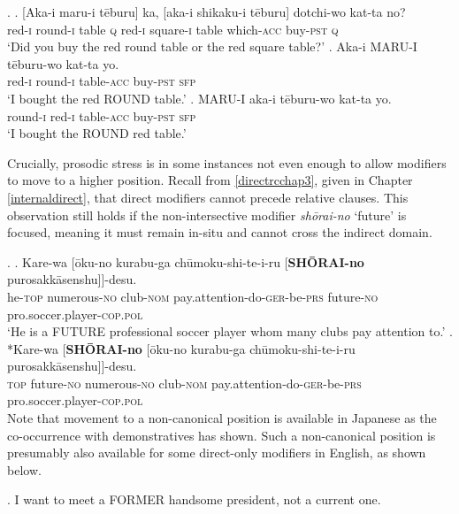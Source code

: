 \documentclass [output=book,colorlinks,citecolor=brown]{langscibook}
\begin{document}

\ex. \label{akamaruchap3} \ag. [Aka-i maru-i tēburu] ka, [aka-i shikaku-i tēburu] dotchi-wo kat-ta no?\\
red-\textsc{i} round-\textsc{i} table \textsc{q} red-\textsc{i} square-\textsc{i} table which-\textsc{acc} buy-\textsc{pst} \textsc{q}\\
`Did you buy the red round table or the red square table?'
\bg. Aka-i MARU-I tēburu-wo kat-ta yo.\\
red-\textsc{i} round-\textsc{i} table-\textsc{acc} buy-\textsc{pst} \textsc{sfp}\\
`I bought the red ROUND table.’
\cg. MARU-I aka-i tēburu-wo kat-ta yo.\\
round-\textsc{i} red-\textsc{i} table-\textsc{acc} buy-\textsc{pst} \textsc{sfp}\\
`I bought the ROUND red table.’

Crucially, prosodic stress is in some instances not even enough to allow modifiers to move to a higher position. Recall from \ref{directrcchap3}, given in Chapter \ref{internaldirect}, that direct modifiers cannot precede relative clauses. This observation still holds if the non-intersective modifier \textit{shōrai-no} `future' is focused, meaning it must remain in-situ and cannot cross the indirect domain.

\newpage

\ex. \ag. Kare-wa [ōku-no kurabu-ga chūmoku-shi-te-i-ru [\textbf{SHŌRAI-no} purosakkāsenshu]]-desu.\\
he-\textsc{top} numerous-\textsc{no} club-\textsc{nom} pay.attention-do-\textsc{ger}-be-\textsc{prs} future-\textsc{no} pro.soccer.player-\textsc{cop.pol}\\
`He is a FUTURE professional soccer player whom many clubs pay attention to.’
\bg. *Kare-wa [\textbf{SHŌRAI-no} [ōku-no kurabu-ga chūmoku-shi-te-i-ru purosakkāsenshu]]-desu.\\
\textsc{top} future-\textsc{no} numerous-\textsc{no} club-\textsc{nom} pay.attention-do-\textsc{ger}-be-\textsc{prs} pro.soccer.player-\textsc{cop.pol}\\

Note that movement to a non-canonical position is available in Japanese as the co-occurrence with demonstratives has shown. Such a non-canonical position is presumably also available for some direct-only modifiers in English, as shown below.

\ex. I want to meet a FORMER handsome president, not a current one.
\end{document}
